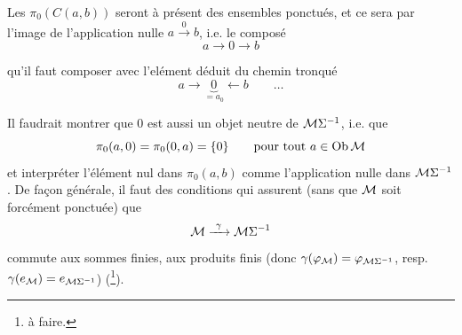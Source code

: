 Les $\pi_0(C(a,b))$ seront à présent des ensembles ponctués, et ce sera par l'image de l'application nulle $a \xrightarrow{\ 0\ } b$, i.e. le composé
\[
a \longrightarrow 0 \longrightarrow b
\]


qu'il faut composer avec l'elément déduit du chemin tronqué %
\[
a \longrightarrow \underbrace{0}_{=a_0} \longleftarrow b \qquad \ldots
\]

Il faudrait montrer que 0 est aussi un objet neutre de $\mathcal{M}\Sigma^{-1}$, i.e. que
\[
\pi_0(a,0) = \pi_0(0,a) = \{0\} \qquad \text{pour tout } a \in \mathrm{Ob}\,\mathcal{M}
\]
et interpréter l'élément nul dans $\pi_0(a,b)$ comme l'application nulle dans $\mathcal{M}\Sigma^{-1}$. De façon générale, il faut des conditions qui assurent (sans que $\mathcal{M}$ soit forcément ponctuée) que
\[
\mathcal{M} \xrightarrow{\ \gamma\ } \mathcal{M}\Sigma^{-1}
\]
commute aux sommes finies, aux produits finis (donc $\gamma(\varphi_{\mathcal{M}}) = \varphi_{\mathcal{M}\Sigma^{-1}}$, resp. $\gamma(e_{\mathcal{M}}) = e_{\mathcal{M}\Sigma^{-1}}$) (\footnote[6]{à faire.}).

